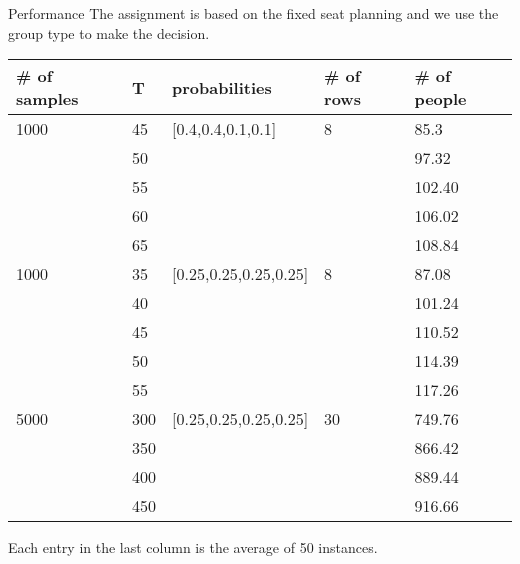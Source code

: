   \begin{frame}{Performance}
    The assignment is based on the fixed seat planning and we use the group type to make the decision. 
    \scriptsize
    \begin{table}[ht]
        \begin{tabular}{|l|l|l|l|l|}
        \hline
        \# of samples & T & probabilities & \# of rows & \# of people \\
        \hline
        1000  & 45  & [0.4,0.4,0.1,0.1] & 8  & 85.3 \\
          & 50  &  &   & 97.32 \\
          & 55  &  &   & 102.40  \\ %
          & 60  &  &   & 106.02  \\
         & 65  &  &   & 108.84 \\
        \hline
        1000  & 35  & [0.25,0.25,0.25,0.25] & 8  & 87.08 \\
          & 40  &  &   & 101.24 \\
          & 45  &  &   & 110.52 \\
          & 50  &  &   & 114.39 \\
          & 55  &  &   & 117.26 \\
        \hline
        5000  & 300  & [0.25,0.25,0.25,0.25] & 30  & 749.76 \\
         & 350  &  &   & 866.42 \\
          & 400  &  &   & 889.44 \\
          & 450  &  &   & 916.66 \\
        \hline
        \end{tabular}
    \end{table}
  
  Each entry in the last column is the average of 50 instances.
  \end{frame}

